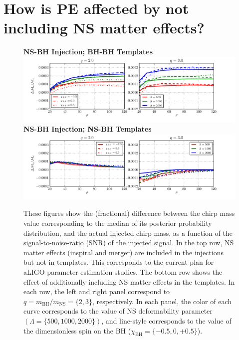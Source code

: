 \documentclass[aps,prd,amsmath,floats,floatfix, twocolumn,
superscriptaddress,nofootinbib,showpacs]{revtex4-1}
\begin{document}
\section{How is PE affected by not including NS matter effects?}
\begin{figure}
\centering 
\textbf{NS-BH Injection; BH-BH Templates}
\includegraphics[width=1.7\columnwidth]{plots/TN_chirpMassBias_vs_SNR_q23.pdf}\\ 
\textbf{NS-BH Injection; NS-BH Templates}
\includegraphics[width=1.7\columnwidth]{plots/TT_chirpMassBias_vs_SNR_q23.pdf}%
\caption{These figures show the (fractional) difference between the chirp mass 
value corresponding to the median of its posterior probability distribution,
and the actual injected chirp mass,
as a function of the signal-to-noise-ratio (SNR) of the injected signal.
In the top row, NS matter effects (inspiral and merger) are included in the
injections but not in templates. This corresponds to the current 
plan for aLIGO parameter estimation studies. The bottom row shows the effect
of additionally including NS matter effects in the templates.
% 
In each row, the left and right panel correspond to 
$q=m_\mathrm{BH}/m_\mathrm{NS}=\{2,3\}$, respectively. 
In each panel, the color of each curve corresponds to the value of NS 
deformability parameter $(\Lambda=\{500,1000,2000\})$, 
and line-style corresponds to the value of
the dimensionless spin on the BH ($\chi_\mathrm{BH}=\{-0.5,0,+0.5\}$).
}
\label{fig:TNT_chirpMassBias_vs_SNR_q23}
\end{figure}
\end{document}
